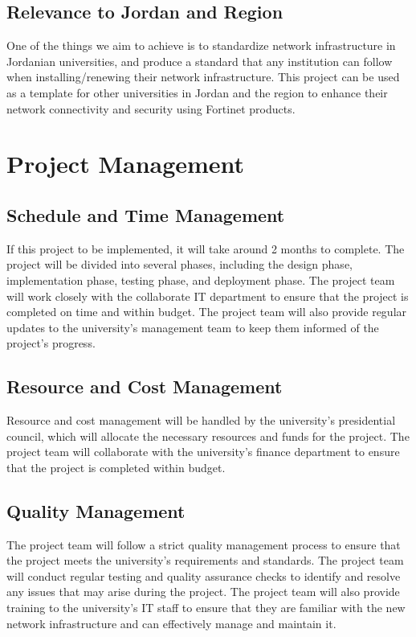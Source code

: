 \documentclass[12pt]{report}
\begin{document}
\section{Relevance to Jordan and Region}
One of the things we aim to achieve is to standardize network infrastructure in Jordanian universities, and produce a standard that any institution can follow when installing/renewing their network infrastructure. This project can be used as a template for other universities in Jordan and the region to enhance their network connectivity and security using Fortinet products.

\chapter{Project Management}

\section{Schedule and Time Management}
If this project to be implemented, it will take around 2 months to complete. The project will be divided into several phases, including the design phase, implementation phase, testing phase, and deployment phase. The project team will work closely with the collaborate IT department to ensure that the project is completed on time and within budget. The project team will also provide regular updates to the university's management team to keep them informed of the project's progress.
\section{Resource and Cost Management}
Resource and cost management will be handled by the university's presidential council, which will allocate the necessary resources and funds for the project. The project team will collaborate with the university's finance department to ensure that the project is completed within budget.
\section{Quality Management}
The project team will follow a strict quality management process to ensure that the project meets the university's requirements and standards. The project team will conduct regular testing and quality assurance checks to identify and resolve any issues that may arise during the project. The project team will also provide training to the university's IT staff to ensure that they are familiar with the new network infrastructure and can effectively manage and maintain it.
\end{document}
